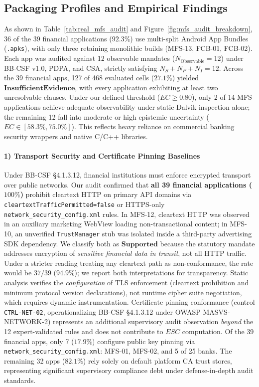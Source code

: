 \subsection{Packaging Profiles and Empirical Findings}
\label{sec:case_study:findings}

As shown in Table~\ref{tab:real_mfs_audit} and Figure~\ref{fig:mfs_audit_breakdown}, 36 of the 39 financial applications ($92.3\%$) use multi-split Android App Bundles (\texttt{.apks}), with only three retaining monolithic builds (MFS-13, FCB-01, FCB-02). Each app was audited against 12 observable mandates ($N_{\text{Observable}} = 12$) under BB-CSF v1.0, PDPA, and CSA, strictly satisfying $N_S + N_P + N_I = 12$. Across the 39 financial apps, 127 of 468 evaluated cells ($27.1\%$) yielded $\mathbf{InsufficientEvidence}$, with every application exhibiting at least two unresolvable clauses. Under our defined threshold ($EC \ge 0.80$), only 2 of 14 MFS applications achieve adequate observability under static Dalvik inspection alone; the remaining 12 fall into moderate or high epistemic uncertainty ($EC \in [58.3\%, 75.0\%]$). This reflects heavy reliance on commercial banking security wrappers and native C/C++ libraries.

\paragraph{1) Transport Security and Certificate Pinning Baselines} Under BB-CSF §4.1.3.12, financial institutions must enforce encrypted transport over public networks. Our audit confirmed that \textbf{all 39 financial applications ($100\%$)} prohibit cleartext HTTP on primary API domains via \texttt{cleartextTrafficPermitted=false} or HTTPS-only \texttt{network\_security\_config.xml} rules. In MFS-12, cleartext HTTP was observed in an auxiliary marketing WebView loading non-transactional content; in MFS-10, an unverified \texttt{TrustManager} stub was isolated inside a third-party advertising SDK dependency. We classify both as $\mathbf{Supported}$ because the statutory mandate addresses encryption of \textit{sensitive financial data in transit}, not all HTTP traffic. Under a stricter reading treating any cleartext path as non-conformance, the rate would be $37/39$ ($94.9\%$); we report both interpretations for transparency. Static analysis verifies the \textit{configuration} of TLS enforcement (cleartext prohibition and minimum protocol version declarations), not runtime cipher suite negotiation, which requires dynamic instrumentation. Certificate pinning conformance (control \texttt{CTRL-NET-02}, operationalizing BB-CSF §4.1.3.12 under OWASP MASVS-NETWORK-2) represents an additional supervisory audit observation \textit{beyond} the 12 expert-validated rules and does not contribute to $ESC$ computation. Of the 39 financial apps, only 7 ($17.9\%$) configure public key pinning via \texttt{network\_security\_config.xml}: MFS-01, MFS-02, and 5 of 25 banks. The remaining 32 apps ($82.1\%$) rely solely on default platform CA trust stores, representing significant supervisory compliance debt under defense-in-depth audit standards.


